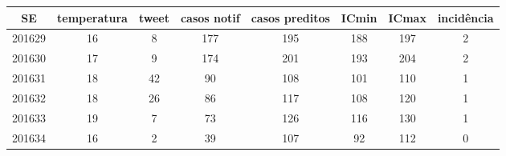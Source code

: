\begin{tabular}{c|ccccccc}
  \hline
SE & temperatura & tweet & casos notif & casos preditos & ICmin & ICmax & incidência \\ 
  \hline
201629 & 16 & 8 & 177 & 195 & 188 & 197 & 2 \\ 
  201630 & 17 & 9 & 174 & 201 & 193 & 204 & 2 \\ 
  201631 & 18 & 42 & 90 & 108 & 101 & 110 & 1 \\ 
  201632 & 18 & 26 & 86 & 117 & 108 & 120 & 1 \\ 
  201633 & 19 & 7 & 73 & 126 & 116 & 130 & 1 \\ 
  201634 & 16 & 2 & 39 & 107 & 92 & 112 & 0 \\ 
   \hline
\end{tabular}
